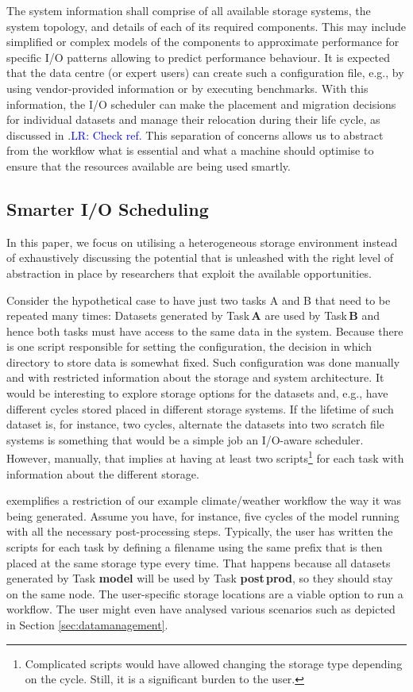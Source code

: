 \documentclass{superfri}
\newcommand{\lr}[1]{\textcolor{blue}{LR: #1}}
\begin{document}
The system information shall comprise of all available storage systems, the system topology, and details of each of its required components.
This may include simplified or complex models of the components to approximate performance for specific I/O patterns allowing to predict performance behaviour.
It is expected that the data centre (or expert users) can create such a configuration file, e.g., by using vendor-provided information or by executing benchmarks.
With this information, the I/O scheduler can make the placement and migration decisions for individual datasets and manage their relocation during their life cycle, as discussed in .\lr{Check ref.}
This separation of concerns allows us to abstract from the workflow what is essential and what a machine should optimise to ensure that the resources available are being used smartly.

\subsection{Smarter I/O Scheduling}

In this paper, we focus on utilising a heterogeneous storage environment instead of exhaustively discussing the potential that is unleashed with the right level of abstraction in place by researchers that exploit the available opportunities.

Consider the hypothetical case to have just two tasks A and B that need to be repeated many times:
Datasets generated by Task\,\textbf{A} are used by Task\,\textbf{B} and hence both tasks must have access to the same data in the system.
Because there is one script responsible for setting the configuration, the decision in which directory to store data is somewhat fixed.
Such configuration was done manually and with restricted information about the storage and system architecture.
It would be interesting to explore storage options for the datasets and, e.g., have different cycles stored placed in different storage systems.
If the lifetime of such dataset is, for instance, two cycles, alternate the datasets into two scratch file systems is something that would be a simple job an I/O-aware scheduler.
However, manually, that implies at having at least two scripts\footnote{Complicated scripts would have allowed changing the storage type depending on the cycle. Still, it is a significant burden to the user.} for each task with information about the different storage.

 exemplifies a restriction of our example climate/weather workflow the way it was being generated.
Assume you have, for instance, five cycles of the model running with all the necessary post-processing steps.
Typically, the user has written the scripts for each task by defining a filename using the same prefix that is then placed at the same storage type every time.
That happens because all datasets generated by Task \textbf{model} will be used by Task \textbf{post\,prod}, so they should stay on the same node.
The user-specific storage locations are a viable option to run a workflow.
The user might even have analysed various scenarios such as depicted in
Section \ref{sec:datamanagement}.
\end{document}
